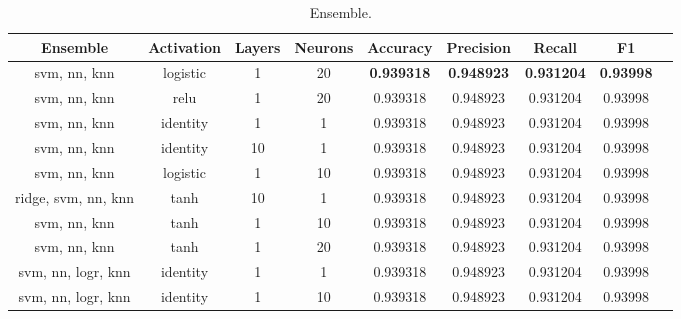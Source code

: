 \begin{appendices}
\begin{table}[ht]
\begin{subtable}{\textwidth}
\begin{adjustbox}{minipage=18cm, center}
\begin{tabular*}{\textwidth}{c @{\extracolsep{\fill}} cccccccc}
\toprule
Ensemble     & Activation & Layers        &  Neurons &  Accuracy &  Precision &    Recall &  F1 \\
\midrule
svm, nn, knn &   logistic & 1             &       20 &  \textbf{0.939318} &   \textbf{0.948923} &  \textbf{0.931204} &  \textbf{0.93998} \\
svm, nn, knn &       relu & 1             &       20 &  0.939318 &   0.948923 &  0.931204 &  0.93998 \\
svm, nn, knn &   identity & 1             &        1 &  0.939318 &   0.948923 &  0.931204 &  0.93998 \\
svm, nn, knn &   identity & 10            &        1 &  0.939318 &   0.948923 &  0.931204 &  0.93998 \\
svm, nn, knn &   logistic & 1             &       10 &  0.939318 &   0.948923 &  0.931204 &  0.93998 \\
ridge, svm, nn, knn & tanh & 10           &        1 &  0.939318 &   0.948923 &  0.931204 &  0.93998 \\
svm, nn, knn &       tanh & 1             &       10 &  0.939318 &   0.948923 &  0.931204 &  0.93998 \\
svm, nn, knn &       tanh & 1             &       20 &  0.939318 &   0.948923 &  0.931204 &  0.93998 \\
svm, nn, logr, knn & identity & 1         &        1 &  0.939318 &   0.948923 &  0.931204 &  0.93998 \\
svm, nn, logr, knn & identity & 1         &       10 &  0.939318 &   0.948923 &  0.931204 &  0.93998 \\
\bottomrule

\end{tabular*}
\caption{\label{tab:Ensemble}Ensemble.}
\end{adjustbox}
\end{subtable}



\end{table}
\end{appendices}
